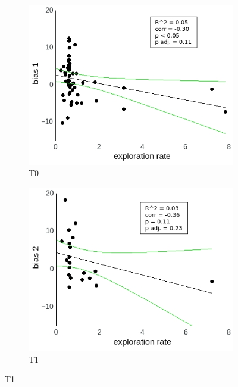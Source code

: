 \documentclass[a4paper]{scrreprt}
\begin{document}
\begin{figure}
\centering
\begin{subfigure}[b]{0.49\textwidth}
        \includegraphics[width=\textwidth]{figs/sec3/temp/temp_diff_1_mod1dat.jpeg}
        \caption{T0}
    \end{subfigure}
    \begin{subfigure}[b]{0.49\textwidth}
        \includegraphics[width=\textwidth]{figs/sec3/temp/temp_diff_2_mod1dat.jpeg}
        \caption{T1}
    \end{subfigure}


\end{figure}
\end{document}
